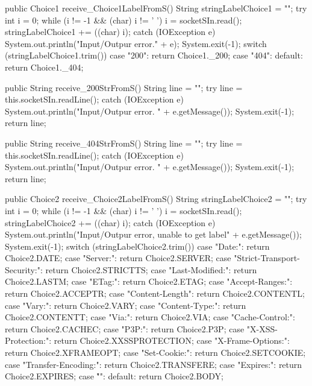 \begin{code}
{    public Choice1 receive_Choice1LabelFromS() {
        String stringLabelChoice1 = "";
		try {
			int i = 0;
			while (i != -1 && (char) i != ' ') {
				i = socketSIn.read();
				stringLabelChoice1 += ((char) i);
			}
		} catch (IOException e) {
			System.out.println("Input/Outpur error." + e);
			System.exit(-1);
		}
        switch (stringLabelChoice1.trim()) {
            case "200":
                return Choice1._200;
            case "404":
            default:
                return Choice1._404;
        }
    }

    public String receive_200StrFromS() {
        String line = "";
        try {
            line = this.socketSIn.readLine();
        } catch (IOException e) {
            System.out.println("Input/Outpur error. " + e.getMessage());
            System.exit(-1);
        }
        return line;
    }

    public String receive_404StrFromS() {
        String line = "";
        try {
            line = this.socketSIn.readLine();
        } catch (IOException e) {
            System.out.println("Input/Outpur error. " + e.getMessage());
            System.exit(-1);
        }
        return line;
    }

    public Choice2 receive_Choice2LabelFromS() {
        String stringLabelChoice2 = "";
        try {
            int i = 0;
            while (i != -1 && (char) i != ' ') {
                i = socketSIn.read();
                stringLabelChoice2 += ((char) i);
            }
        } catch (IOException e) {
            System.out.println("Input/Outpur error, unable to get label" + e.getMessage());
            System.exit(-1);
        }
        switch (stringLabelChoice2.trim()) {
            case "Date:":
                return Choice2.DATE;
            case "Server:":
                return Choice2.SERVER;
            case "Strict-Transport-Security:":
                return Choice2.STRICTTS;
            case "Last-Modified:":
                return Choice2.LASTM;
            case "ETag:":
                return Choice2.ETAG;
            case "Accept-Ranges:":
                return Choice2.ACCEPTR;
            case "Content-Length":
                return Choice2.CONTENTL;
            case "Vary:":
                return Choice2.VARY;
            case "Content-Type:":
                return Choice2.CONTENTT;
            case "Via:":
                return Choice2.VIA;
            case "Cache-Control:":
                return Choice2.CACHEC;
            case "P3P:":
                return Choice2.P3P;
            case "X-XSS-Protection:":
                return Choice2.XXSSPROTECTION;
            case "X-Frame-Options:":
                return Choice2.XFRAMEOPT;
            case "Set-Cookie:":
                return Choice2.SETCOOKIE;
            case "Transfer-Encoding:":
                return Choice2.TRANSFERE;
            case "Expires:":
                return Choice2.EXPIRES;
            case "\r\n":
            default:
                return Choice2.BODY;
        }
    }

}
\end{code}
